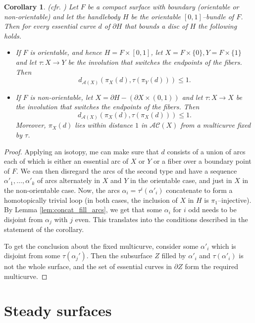 \documentclass[11pt, oneside]{amsart}
\newtheorem{cor}[lemma]{Corollary}
\theoremstyle{definition}
\theoremstyle{definition}
\begin{document}
\begin{cor}\label{cor:MasurSchleimer}(cfr. \cite[Lemma 12.20]{MasurSchleimer})
 Let $F$ be a compact surface with boundary (orientable or non-orientable) and let the handlebody $H$ be the orientable $[0,1]$--bundle of $F$. Then for every essential curve $d$ of $\partial H$ that bounds a disc of $H$ the following holds.
 \begin{itemize}
  \item If $F$ is orientable, and hence $H=F\times[0,1]$, let $X=F\times\{0\},Y=F\times\{1\}$ and let $\tau:X\to Y$ be the involution that switches the endpoints of the fibers. Then
  $$d_{\mathcal A(X)}(\pi_X(d),\tau(\pi_Y(d)))\leq 1.$$
  \item If $F$ is non-orientable, let $X=\partial H-(\partial X\times(0,1))$ and let $\tau:X\to X$ be the involution that switches the endpoints of the fibers. Then
  $$d_{\mathcal A(X)}(\pi_X(d),\tau(\pi_X(d)))\leq 1.$$
  Moreover, $\pi_X(d)$ lies within distance $1$ in $\mathcal{AC}(X)$ from a multicurve fixed by $\tau$.
 \end{itemize}
\end{cor}

\begin{proof}
 Applying an isotopy, me can make sure that $d$ consists of a union of arcs each of which is either an essential arc of $X$ or $Y$ or a fiber over a boundary point of $F$. We can then disregard the arcs of the second type and have a sequence $\alpha'_1,\dots,\alpha'_k$ of arcs alternately in $X$ and $Y$ in the orientable case, and just in $X$ in the non-orientable case. Now, the arcs $\alpha_i=\tau^i(\alpha'_i)$ concatenate to form a homotopically trivial loop (in both cases, the inclusion of $X$ in $H$ is $\pi_1$--injective). By Lemma \ref{lem:concat_fill_arcs}, we get that some $\alpha_i$ for $i$ odd needs to be disjoint from $\alpha_j$ with $j$ even. This translates into the conditions described in the statement of the corollary.
 
  To get the conclusion about the fixed multicurve, consider some $\alpha'_i$ which is disjoint from some $\tau(\alpha_j')$. Then the subsurface $Z$ filled by $\alpha'_i$ and $\tau(\alpha'_i)$ is not the whole surface, and the set of essential curves in $\partial Z$ form the required multicurve.
\end{proof}



\section{Steady surfaces}
\end{document}
